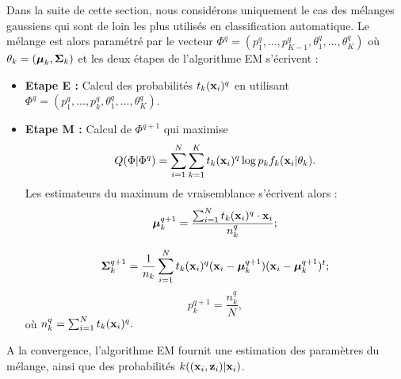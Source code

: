 Dans la suite de cette section, nous consid\'erons
uniquement le cas des m\'elanges
gaussiens qui sont de loin les  plus utilis\'es en classification
automatique. Le m\'elange est alors  param\'etr\'e par le vecteur
$\Phi^q=(p_1^q,...,p_{K-1}^q, \theta_1^q,...,\theta_K^q)$ o\`u $\theta_k=(\mbox{\boldmath $\mu$}_k, \mbox{\boldmath $\Sigma$}_k)$ et les deux \'etapes de l'algorithme EM s'\'ecrivent :
\begin{itemize}
\item {\bf Etape E :} Calcul des probabilit\'es $t_k(\mbox{\bf x}_i)^q$ en utilisant
$\Phi^q=(p_1^q,...,p_k^q, \theta_1^q,...,\theta_K^q)$.
\item {\bf Etape M :} Calcul de $\Phi^{q+1}$ qui maximise
$$
Q(\Phi | \Phi^q)=\sum_{i=1}^N \sum_{k=1}^{K} t_k(\mbox{\bf x}_i)^q \log{p_{k} f_k(\mbox{\bf x}_i |
\theta_{k})}.
$$
Les estimateurs du maximum de vraisemblance s'\'ecrivent alors :
\begin{equation} 
\mbox{\boldmath $\mu$}_k^{q+1}=\frac{\sum_{i=1}^N t_k(\mbox{\bf x}_i)^q \cdot \mbox{\bf x}_i}{n_k^{q}} ;
\end{equation}

\begin{equation}
\mbox{\boldmath $\Sigma$}_k^{q+1}=\frac{1}{n_k} \sum_{i=1}^N t_{k}(\mbox{\bf x}_i)^q (\mbox{\bf x}_i- \mbox{\boldmath $\mu$}_k^{q+1}) (\mbox{\bf x}_i- \mbox{\boldmath $\mu$}_k^{q+1})^t ;  
\end{equation}
\begin{equation} 
p_k^{q+1}=\frac{n_k^{q}}{N}, 
\end{equation}
o\`u $n_k^{q}=\sum_{i=1}^N t_k(\mbox{\bf x}_i)^q.$
\end{itemize}

A la convergence, l'algorithme EM fournit une estimation des param\`etres
du m\'elange, ainsi que des probabilit\'es $k((\mbox{\bf x}_i, \mbox{\bf z}_i) | \mbox{\bf x}_i)$.



